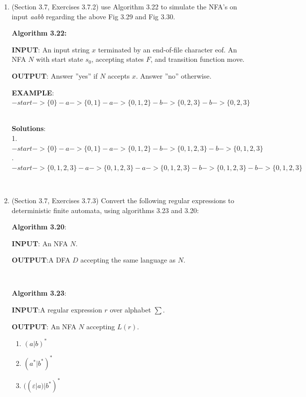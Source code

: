 \documentclass[12pt,a4paper]{article}
\makeatletter
\newtheorem*{solution}{Solution}
\renewenvironment{solution}[1][Solution] {\par\pushQED{\qed}\normalfont\topsep6\p@\@plus6\p@\relax\trivlist\item[\hskip\labelsep\bfseries#1\@addpunct{.}]\ignorespaces}{\popQED\endtrivlist\@endpefalse} \makeatother
\makeatother
\begin{document}
\begin{enumerate}
\begin{enumerate}
    \end{enumerate}

\newpage
\textrm{\\}

\item (Section 3.7, Exercises 3.7.2) use Algorithm 3.22 to simulate the NFA's on input \emph{aabb} regarding the above Fig 3.29 and Fig 3.30.

    \textbf{Algorithm 3.22:}

    \textbf{INPUT}: An input string $x$ terminated by an end-of-file character eof. An NFA $N$ with start state $s_0$, accepting states $F$, and transition function move.

    \textbf{OUTPUT}: Answer ''yes'' if $N$ accepts $x$. Answer ''no'' otherwise.

    \textbf{EXAMPLE}: $-start->\{0\}-a->\{0,1\}-a->\{0,1,2\}-b->\{0,2,3\}-b->\{0,2,3\}$


    \textrm{\\}
    \textbf{Solutions}:
    \textrm{\\}
    1. $-start->\{0\}-a->\{0,1\}-a->\{0,1,2\}-b->\{0,1,2,3\}-b->\{0,1,2,3\}$
    . $-start->\{0,1,2,3\}-a->\{0,1,2,3\}-a->\{0,1,2,3\}-b->\{0,1,2,3\}-b->\{0,1,2,3\}$


\textrm{\\}

\item (Section 3.7, Exercises 3.7.3) Convert the following regular expressions to deterministic finite automata, using algorithms 3.23 and 3.20:

    \textbf{Algorithm 3.20}:

    \textbf{INPUT}: An NFA $N$.

    \textbf{OUTPUT}:A DFA $D$ accepting the same language as $N$.

    \textrm{\\}

    \textbf{Algorithm 3.23}:

    \textbf{INPUT}:A regular expression $r$ over alphabet $\sum$.

    \textbf{OUTPUT}: An NFA $N$ accepting $L(r)$.

    \begin{enumerate}
    \item $(a|b)^*$
    \item $(a^*|b^*)^*$
    \item $((\varepsilon|a)|b^*)^*$
    \end{enumerate}


\end{enumerate}
\end{document}
